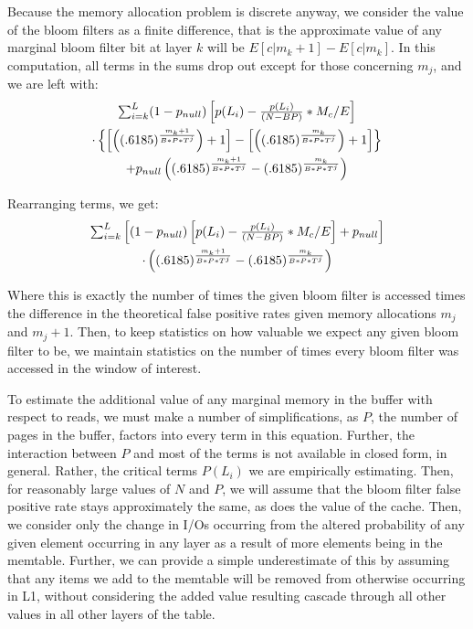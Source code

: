 \documentclass{sig-alternate-05-2015}
\begin{document}
Because the memory allocation problem is discrete anyway, we consider the value of the bloom filters as a finite difference, that is the approximate value of any marginal bloom filter bit at layer $k$ will be $E[c | m_k+1] - E[c | m_k]$. In this computation, all terms in the sums drop out except for those concerning $m_j$, and we are left with:
\begin{multline}
$$\sum_{i=k}^{L} (1-p_{null})\left[p(L_i) - \frac{p(L_i)}{(N - BP)} * M_c/E \right] \\ \cdot \left\{ \left[ \left( (.6185) ^  {\frac{m_k+1}{B*P*T^j}}\right) +1 \right] - \left[ \left( (.6185) ^  {\frac{m_k}{B*P*T^j}}\right) +1 \right] \right\} \\+ p_{null}  \left( (.6185) ^  {\frac{m_k+1}{B*P*T^j}} - (.6185) ^  {\frac{m_k}{B*P*T^j}}\right)$$
\end{multline}

Rearranging terms, we get:
\begin{multline}
$$\sum_{i=k}^{L} \left[(1-p_{null})\left[p(L_i) - \frac{p(L_i)}{(N - BP)} * M_c/E \right] +  p_{null} \right] \\ \cdot \left( (.6185) ^  {\frac{m_k+1}{B*P*T^j}} - (.6185) ^  {\frac{m_k}{B*P*T^j}}\right)$$
\end{multline}

Where this is exactly the number of times the given bloom filter is accessed times the difference in the theoretical false positive rates given memory allocations $m_j$ and $m_j+1$. Then, to keep statistics on how valuable we expect any given bloom filter to be, we maintain statistics on the number of times every bloom filter was accessed in the window of interest.

To estimate the additional value of any marginal memory in the buffer with respect to reads, we must make a number of simplifications, as $P$, the number of pages in the buffer, factors into every term in this equation. Further, the interaction between $P$ and most of the terms is not available in closed form, in general. Rather, the critical terms $P(L_i)$ we are empirically estimating. Then, for reasonably large values of $N$ and $P$, we will assume that the bloom filter false positive rate stays approximately the same, as does the value of the cache. Then, we consider only the change in I/Os occurring from the altered probability of any given element occurring in any layer as a result of more elements being in the memtable. Further, we can provide a simple underestimate of this by assuming that any items we add to the memtable will be removed from otherwise occurring in L1, without considering the added value resulting cascade through all other values in all other layers of the table.
\end{document}

